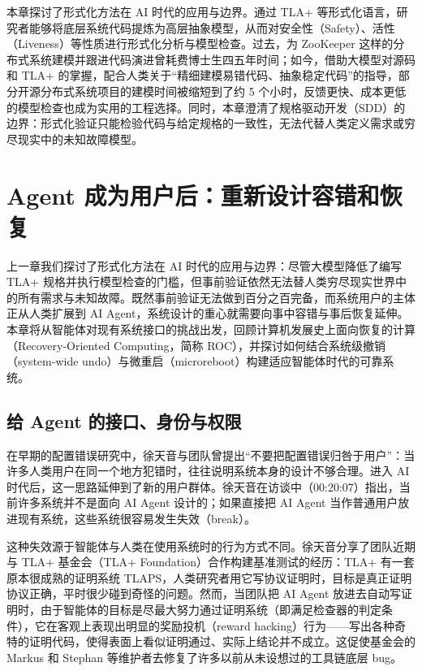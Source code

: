 \documentclass[UTF8,a4paper,11pt,fontset=fandol]{ctexart}
\begin{document}
本章探讨了形式化方法在 AI 时代的应用与边界。通过 TLA+ 等形式化语言，研究者能够将底层系统代码提炼为高层抽象模型，从而对安全性（Safety）、活性（Liveness）等性质进行形式化分析与模型检查。过去，为 ZooKeeper 这样的分布式系统建模并跟进代码演进曾耗费博士生四五年时间；如今，借助大模型对源码和 TLA+ 的掌握，配合人类关于“精细建模易错代码、抽象稳定代码”的指导，部分开源分布式系统项目的建模时间被缩短到了约 5 个小时，反馈更快、成本更低的模型检查也成为实用的工程选择。同时，本章澄清了规格驱动开发（SDD）的边界：形式化验证只能检验代码与给定规格的一致性，无法代替人类定义需求或穷尽现实中的未知故障模型。
\section{Agent 成为用户后：重新设计容错和恢复}
上一章我们探讨了形式化方法在 AI 时代的应用与边界：尽管大模型降低了编写 TLA+ 规格并执行模型检查的门槛，但事前验证依然无法替人类穷尽现实世界中的所有需求与未知故障。既然事前验证无法做到百分之百完备，而系统用户的主体正从人类扩展到 AI Agent，系统设计的重心就需要向事中容错与事后恢复延伸。本章将从智能体对现有系统接口的挑战出发，回顾计算机发展史上面向恢复的计算（Recovery-Oriented Computing，简称 ROC），并探讨如何结合系统级撤销（system-wide undo）与微重启（microreboot）构建适应智能体时代的可靠系统。
\subsection{给 Agent 的接口、身份与权限}
在早期的配置错误研究中，徐天音与团队曾提出“不要把配置错误归咎于用户”：当许多人类用户在同一个地方犯错时，往往说明系统本身的设计不够合理。进入 AI 时代后，这一思路延伸到了新的用户群体。徐天音在访谈中（00:20:07）指出，当前许多系统并不是面向 AI Agent 设计的；如果直接把 AI Agent 当作普通用户放进现有系统，这些系统很容易发生失效（break）。

这种失效源于智能体与人类在使用系统时的行为方式不同。徐天音分享了团队近期与 TLA+ 基金会（TLA+ Foundation）合作构建基准测试的经历：TLA+ 有一套原本很成熟的证明系统 TLAPS，人类研究者用它写协议证明时，目标是真正证明协议正确，平时很少碰到奇怪的问题。然而，当团队把 AI Agent 放进去自动写证明时，由于智能体的目标是尽最大努力通过证明系统（即满足检查器的判定条件），它在客观上表现出明显的奖励投机（reward hacking）行为——写出各种奇特的证明代码，使得表面上看似证明通过、实际上结论并不成立。这促使基金会的 Markus 和 Stephan 等维护者去修复了许多以前从未设想过的工具链底层 bug。
\end{document}
